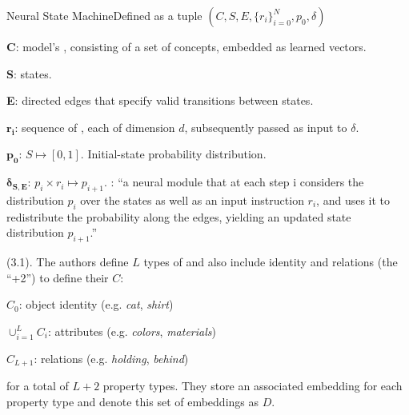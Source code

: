 \documentclass[11pt]{article}
\begin{document}
\begin{itemdefinition}{Neural State Machine}{Defined as a tuple $(C, S, E, \{r_i\}_{i=0}^{N}, p_0, \delta)$}
	\item \textbf{C}: model's , consisting of a set of concepts, embedded as learned vectors.
	
	\item \textbf{S}: states.
	
	\item \textbf{E}: directed edges that specify valid transitions between states.
	
	\item $\bm{r_i}$:  sequence of , each of dimension $d$, subsequently passed as input to $\delta$. 
	
	\item $\bm{p_0}$: $S \mapsto [0, 1]$. Initial-state probability distribution.
	
	\item $\bm{\delta_{S,E}}$: $p_i \times r_i \mapsto p_{i+1}$. : ``a neural module that at each step i considers the distribution $p_i$ over the states as well as an input instruction $r_i$, and uses it to redistribute the probability along the edges, yielding an updated state distribution $p_{i+1}$.'' 
\end{itemdefinition}


 (3.1). The authors define $L$ types of  and also include identity and relations (the ``+2'') to define their  $C$:
\begin{compactitem}
	\item $C_0$: object identity (e.g. \textit{cat}, \textit{shirt})
	
	\item $\cup_{i=1}^L C_i$: attributes (e.g. \textit{colors}, \textit{materials})
	
	\item $C_{L+1}$: relations (e.g. \textit{holding}, \textit{behind})
\end{compactitem}
for a total of $L+2$ property types. They store an associated embedding for each property type and denote this set of embeddings as $D$.
\end{document}
